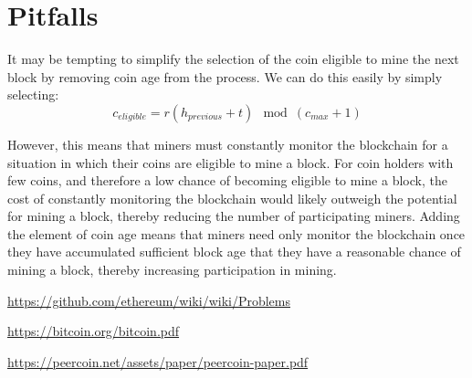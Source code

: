 \documentclass{article}
\begin{document}
\section{Pitfalls}

It may be tempting to simplify the selection of the coin eligible to mine the next block by removing coin age from the process. We can do this easily by simply selecting:
\[c_{eligible} = r(h_{previous} + t) \mod (c_{max} + 1)\]

However, this means that miners must constantly monitor the blockchain for a situation in which their coins are eligible to mine a block. For coin holders with few coins, and therefore a low chance of becoming eligible to mine a block, the cost of constantly monitoring the blockchain would likely outweigh the potential for mining a block, thereby reducing the number of participating miners. Adding the element of coin age means that miners need only monitor the blockchain once they have accumulated sufficient block age that they have a reasonable chance of mining a block, thereby increasing participation in mining.

\newpage

\begin{thebibliography}{10}

 \url{https://github.com/ethereum/wiki/wiki/Problems}

 \url{https://bitcoin.org/bitcoin.pdf}

 \url{https://peercoin.net/assets/paper/peercoin-paper.pdf}

\end{thebibliography}
\end{document}

